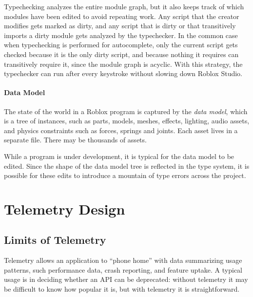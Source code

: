\documentclass[english,submission,cleveref]{programming}
\begin{document}
Typechecking analyzes the entire module graph, but it also keeps track of which
modules have been edited to avoid repeating work.
Any script that the creator modifies gets marked as dirty,
and any script that is dirty or that transitively imports a dirty
module gets analyzed by the typechecker.
In the common case when typechecking is performed for autocomplete,
only the current script gets checked because it is the only dirty
script, and because nothing it requires can transitively require it, since
the module graph is acyclic.
With this strategy, the typechecker can run after every keystroke without
slowing down Roblox Studio.


\paragraph{Data Model}

The state of the world in a {Roblox} program is captured by
the \emph{data model}, which is a tree of {instances}, such as
parts, models, meshes, effects, lighting, audio assets, and physics
constraints such as forces, springs and joints.
Each asset lives in a separate file.
There may be thousands of assets.

While a program is under development, it is typical for the data
model to be edited.
Since the shape of the data model tree is reflected in
the type system, it is possible for these edits to introduce a mountain
of type errors across the project.


\section{Telemetry Design}

\subsection{Limits of Telemetry}

Telemetry allows an application to ``phone home'' with data
summarizing usage patterns, such performance data, crash reporting,
and feature uptake. A typical usage is in deciding whether an API can
be deprecated: without telemetry it may be difficult to know how
popular it is, but with telemetry it is
straightforward.
\end{document}
